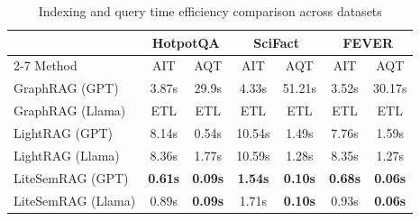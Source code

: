 \documentclass[conference]{IEEEtran}
\begin{document}
\begin{table}[t]
\centering
\small
\setlength{\tabcolsep}{6pt}
\caption{Indexing and query time efficiency comparison across datasets}
\label{tab:Time_results}

\begin{tabular}{lcccccc}
\hline
                  & \multicolumn{2}{c}{HotpotQA}    & \multicolumn{2}{c}{SciFact}     & \multicolumn{2}{c}{FEVER}       \\ \cline{2-7}
Method            & AIT            & AQT            & AIT            & AQT            & AIT            & AQT            \\ \hline
GraphRAG (GPT)    & 3.87s          & 29.9s          & 4.33s          & 51.21s         & 3.52s          & 30.17s         \\
GraphRAG (Llama)  & ETL            & ETL            & ETL            & ETL            & ETL            & ETL            \\
LightRAG (GPT)    & 8.14s          & 0.54s          & 10.54s         & 1.49s          & 7.76s          & 1.59s          \\
LightRAG (Llama)  & 8.36s          & 1.77s          & 10.59s         & 1.28s          & 8.35s          & 1.27s          \\
LiteSemRAG (GPT)   & \textbf{0.61s} & \textbf{0.09s} & \textbf{1.54s} & \textbf{0.10s} & \textbf{0.68s} & \textbf{0.06s} \\
LiteSemRAG (Llama) & 0.89s          & \textbf{0.09s} & 1.71s          & \textbf{0.10s} & 0.93s          & \textbf{0.06s} \\ \hline
\end{tabular}
\end{table}
\end{document}

